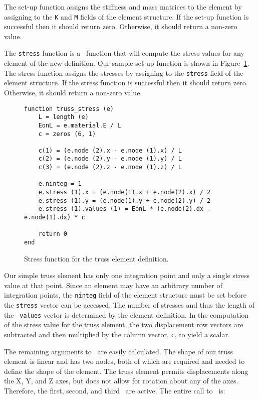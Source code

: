 The set-up function assigns the stiffness and mass matrices to the
element by assigning to the {\tt K} and {\tt M} fields of the element
structure.  If the set-up function is successful then it should return
zero.  Otherwise, it should return a non-zero value.

The {\tt stress} function is a \burlap\ function that will compute the
stress values for any element of the new definition.  Our sample
set-up function is shown in Figure~\ref{burlap.truss.stress}.  The
stress function assigns the stresses by assigning to the {\tt stress}
field of the element structure.  If the stress function is successful
then it should return zero.  Otherwise, it should return a non-zero
value.

\begin{figure}[htbp]
\begin{center}
\begin{verbatim}
function truss_stress (e)
    L = length (e)
    EonL = e.material.E / L
    c = zeros (6, 1)

    c(1) = (e.node (2).x - e.node (1).x) / L
    c(2) = (e.node (2).y - e.node (1).y) / L
    c(3) = (e.node (2).z - e.node (1).z) / L

    e.ninteg = 1
    e.stress (1).x = (e.node(1).x + e.node(2).x) / 2
    e.stress (1).y = (e.node(1).y + e.node(2).y) / 2
    e.stress (1).values (1) = EonL * (e.node(2).dx - e.node(1).dx) * c

    return 0
end
\end{verbatim}
\caption{Stress function for the truss element definition.}
\label{burlap.truss.stress}
\end{center}
\end{figure}


Our simple truss element has only one integration point and only a
single stress value at that point.  Since an element may have an
arbitrary number of integration points, the {\tt ninteg} field of the
element structure must be set before the {\tt stress} vector can be
accessed.  The number of stresses and thus the length of the {\tt
values} vector is determined by the element definition.  In the
computation of the stress value for the truss element, the two
displacement row vectors are subtracted and then multiplied by the
column vector, {\tt c}, to yield a scalar.

The remaining arguments to \adddef\ are easily calculated.  The shape
of our truss element is linear and has two nodes, both of which are
required and needed to define the shape of the element.  The truss
element permits displacements along the X, Y, and Z axes, but does not
allow for rotation about any of the axes.  Therefore, the first,
second, and third \dofs\ are active.  The entire call to \adddef\ is:


